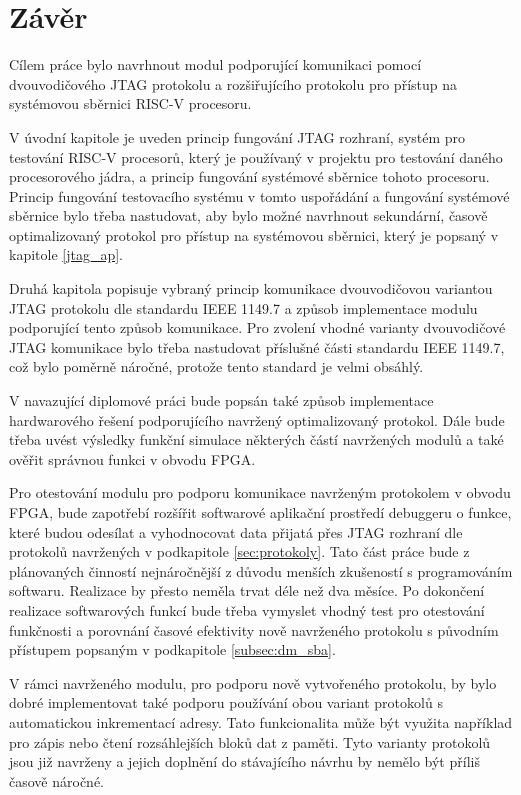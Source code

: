 \chapter*{Závěr}
{}

Cílem práce bylo navrhnout modul podporující komunikaci pomocí dvouvodičového \acs{JTAG} protokolu a rozšiřujícího protokolu pro přístup na systémovou sběrnici \acs{RISC-V} procesoru.

V úvodní kapitole je uveden princip fungování \acs{JTAG} rozhraní, systém pro testování \acs{RISC-V} procesorů, který je používaný v projektu pro testování daného procesorového jádra, a princip fungování systémové sběrnice tohoto procesoru. Princip fungování testovacího systému v tomto uspořádání a fungování systémové sběrnice bylo třeba nastudovat, aby bylo možné navrhnout sekundární, časově optimalizovaný protokol pro přístup na systémovou sběrnici, který je popsaný v kapitole \ref{jtag_ap}.

Druhá kapitola popisuje vybraný princip komunikace dvouvodičovou variantou \acs{JTAG} protokolu dle standardu IEEE 1149.7 a způsob implementace modulu podporující tento způsob komunikace. Pro zvolení vhodné varianty dvouvodičové \acs{JTAG} komunikace bylo třeba nastudovat příslušné části standardu IEEE 1149.7, což bylo poměrně náročné, protože tento standard je velmi obsáhlý.

V navazující diplomové práci bude popsán také způsob implementace hardwarového řešení podporujícího navržený optimalizovaný protokol. Dále bude třeba uvést výsledky funkční simulace některých částí navržených modulů a také ověřit správnou funkci v obvodu \acs{FPGA}.

Pro otestování modulu pro podporu komunikace navrženým protokolem v obvodu \acs{FPGA}, bude zapotřebí rozšířit softwarové aplikační prostředí debuggeru o funkce, které budou odesílat a vyhodnocovat data přijatá přes \acs{JTAG} rozhraní dle protokolů navržených v podkapitole \ref{sec:protokoly}. Tato část práce bude z plánovaných činností nejnáročnější z důvodu menších zkušeností s programováním softwaru. Realizace by přesto neměla trvat déle než dva měsíce. Po dokončení realizace softwarových funkcí bude třeba vymyslet vhodný test pro otestování funkčnosti a porovnání časové efektivity nově navrženého protokolu s původním přístupem popsaným v podkapitole \ref{subsec:dm_sba}.

V rámci navrženého modulu, pro podporu nově vytvořeného protokolu, by bylo dobré implementovat také podporu používání obou variant protokolů s automatickou inkrementací adresy. Tato funkcionalita může být využita například pro zápis nebo čtení rozsáhlejších bloků dat z paměti. Tyto varianty protokolů jsou již navrženy a jejich doplnění do stávajícího návrhu by nemělo být příliš časově náročné.